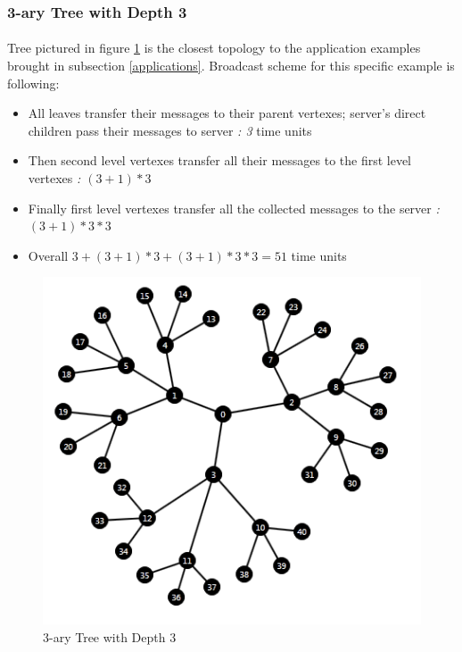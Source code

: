 \documentclass[a4paper,TexShade]{class}
\begin{document}
\subsubsection{3-ary Tree with Depth 3}
\paragraph{} Tree pictured in figure \ref{fig:tree} is the closest topology to the application examples brought in subsection \ref{applications}. Broadcast scheme for this specific example is following:

\bigskip
\begin{itemize}
\item All leaves transfer their messages to their parent vertexes;\linebreak
server's direct children pass their messages to server  \textit{ : 3} time units
\item Then second level vertexes transfer all their messages to the first level vertexes \textit{ : $ (3 + 1) * 3$}
\item Finally first level vertexes transfer all the collected messages to the server \textit{ : $ (3 + 1) * 3 * 3$}
\item Overall \textit{ $3 + (3 + 1) * 3 + (3 + 1) * 3 * 3 = 51$ } time units
\end{itemize}

\bigskip
\begin{figure}[h]
\centering
\includegraphics[width=0.8\linewidth ,natwidth=445,natheight=408]{images/3ary-3-tree.png}
\caption{3-ary Tree with Depth 3} \label{fig:tree}
\end{figure}
\end{document}
